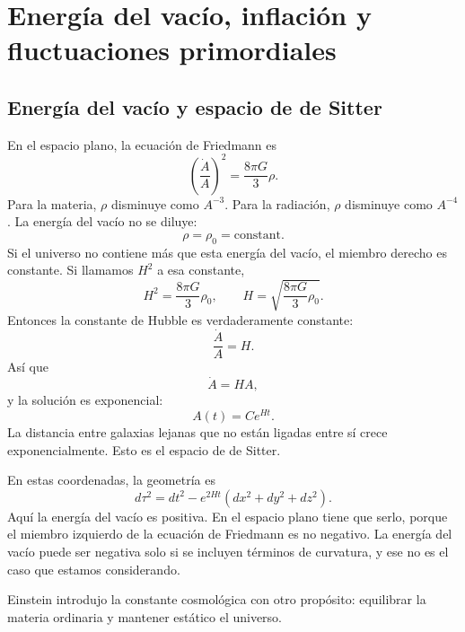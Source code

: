 \chapter{Energía del vacío, inflación y fluctuaciones primordiales}

\section{Energía del vacío y espacio de de Sitter}

En el espacio plano, la ecuación de Friedmann es
\begin{equation}
\left(\frac{\dot A}{A}\right)^2=\frac{8\pi G}{3}\rho.
\end{equation}
Para la materia, \(\rho\) disminuye como \(A^{-3}\). Para la radiación, \(\rho\) disminuye como \(A^{-4}\). La energía del vacío no se diluye:
\begin{equation}
\rho=\rho_0=\text{constant}.
\end{equation}
Si el universo no contiene más que esta energía del vacío, el miembro derecho es constante. Si llamamos \(H^2\) a esa constante,
\begin{equation}
H^2=\frac{8\pi G}{3}\rho_0,
\qquad
H=\sqrt{\frac{8\pi G}{3}\rho_0}.
\end{equation}
Entonces la constante de Hubble es verdaderamente constante:
\begin{equation}
\frac{\dot A}{A}=H.
\end{equation}
Así que
\begin{equation}
\dot A=HA,
\end{equation}
y la solución es exponencial:
\begin{equation}
A(t)=C e^{Ht}.
\end{equation}
La distancia entre galaxias lejanas que no están ligadas entre sí crece exponencialmente. Esto es el espacio de de Sitter.

En estas coordenadas, la geometría es
\begin{equation}
d\tau^2=dt^2-e^{2Ht}\left(dx^2+dy^2+dz^2\right).
\end{equation}
Aquí la energía del vacío es positiva. En el espacio plano tiene que serlo, porque el miembro izquierdo de la ecuación de Friedmann es no negativo. La energía del vacío puede ser negativa solo si se incluyen términos de curvatura, y ese no es el caso que estamos considerando.

Einstein introdujo la constante cosmológica con otro propósito: equilibrar la materia ordinaria y mantener estático el universo.

